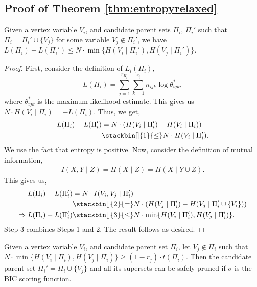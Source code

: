 \documentclass[letterpaper]{article}
\newenvironment{customthm}[1]
  {\renewcommand\theinnercustomthm{#1}\innercustomthm}
  {\endinnercustomthm}
\newenvironment{customlem}[1]
  {\renewcommand\theinnercustomlem{#1}\innercustomlem}
  {\endinnercustomlem}
\begin{document}
\subsection{Proof of Theorem \ref{thm:entropyrelaxed}}

\begin{customlem}{5A}\cite{Campos2017}
Given a vertex variable $V_i$, and candidate parent sets $\Pi_i$, $\Pi_i'$ such that $\Pi_i = \Pi_i' \cup \{V_j\}$ for some variable $V_j \notin \Pi_i'$, we have  $L(\Pi_i) - L(\Pi_i') \leq  N \cdot  \min\{H(V_i \mid \Pi_i'), H(V_j  \mid \Pi_i')\}$. \label{lem:entropy1}
\end{customlem}

\begin{proof}
First, consider the definition of $L_{i}(\Pi_i)$,
\begin{equation*}
    L(\Pi_i) = \sum_{j=1}^{r_{\Pi_i}}\sum_{k=1}^{r_i} n_{ijk} \log {\theta}_{ijk}^{\ast} ,
\end{equation*}
where ${\theta}_{ijk}^{\ast}$ is the maximum likelihood estimate. This gives us $N\cdot H(V_i \mid \Pi_i) = -L(\Pi_i)$. Thus, we get,
\begin{align*}
    L(\Pi_i) - L(\Pi_i') &= N\cdot (H(V_i \mid  \Pi_i') - H(V_i \mid  \Pi_i))\\
                            &\stackbin[]{1}{\leq} N\cdot H(V_i \mid  \Pi_i') .
\end{align*}
We use the fact that entropy is positive. Now, consider the definition of mutual information,
\begin{align*}
    I(X,Y \mid Z) = H(X \mid Z) = H(X \mid Y \cup Z).
\end{align*}
This gives us,
\begin{align*}
    L(\Pi_i) - L(\Pi_i') &= N \cdot I(V_i, V_j  \mid  \Pi_i')\\
                        & \stackbin[]{2}{=} N\cdot (H(V_j \mid  \Pi_i') - H(V_j \mid \Pi_i' \cup \{V_i\}))\\
    \Rightarrow L(\Pi_i) - L(\Pi_i') &\stackbin[]{3}{\leq} N \cdot  \min\{H(V_i \mid \Pi_i'), H(V_j  \mid \Pi_i')\}.
\end{align*}
Step 3 combines Steps 1 and 2. The result follows as desired.
\end{proof}

\begin{customthm}{5B}
\cite{Campos2017}
Given a vertex variable $V_i$, and candidate parent set $\Pi_i$, let $V_j \notin \Pi_i$  such that $N \cdot \min \{H(V_i \mid  \Pi_i), H(V_j  \mid \Pi_i)\} \geq (1 - r_{j}) \cdot t(\Pi_i)$. Then the candidate parent set $\Pi_i' = \Pi_i \cup \{V_j \}$ and all its supersets can be safely pruned if $\sigma$ is the BIC scoring function. 
\end{customthm}
\end{document}
